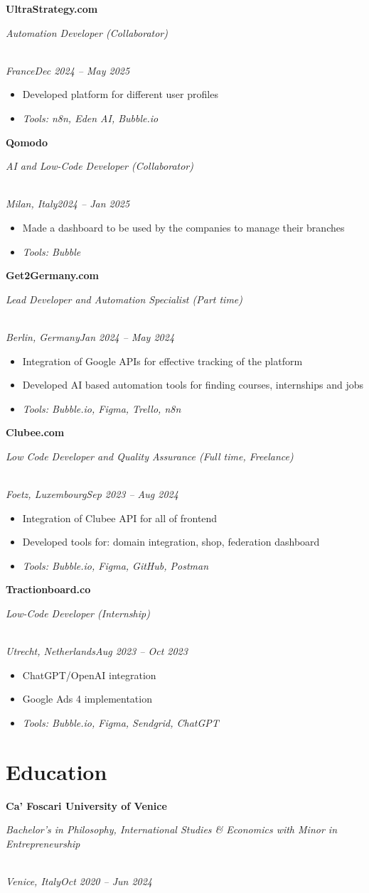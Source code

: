 \documentclass[a4paper,10pt]{article}
\newcommand{\role}[4]{\vspace{3pt}\noindent\hspace{0.6em}\parbox[t]{0.38\textwidth}{\raggedright\textbf{#1}}\hfill\parbox[t]{0.58\textwidth}{\raggedleft\textit{#2}}\\{\textit{#3}\hfill\textit{#4}}\vspace{1pt}}
\begin{document}
\role{UltraStrategy.com}{Automation Developer (Collaborator)}{France}{Dec 2024 -- May 2025}
\begin{itemize}
\item Developed platform for different user profiles
\item \textit{Tools: n8n, Eden AI, Bubble.io}
\end{itemize}

\role{Qomodo}{AI and Low-Code Developer (Collaborator)}{Milan, Italy}{2024 -- Jan 2025}
\begin{itemize}
\item Made a dashboard to be used by the companies to manage their branches
\item \textit{Tools: Bubble}
\end{itemize}

\role{Get2Germany.com}{Lead Developer and Automation Specialist (Part time)}{Berlin, Germany}{Jan 2024 -- May 2024}
\begin{itemize}
\item Integration of Google APIs for effective tracking of the platform
\item Developed AI based automation tools for finding courses, internships and jobs
\item \textit{Tools: Bubble.io, Figma, Trello, n8n}
\end{itemize}

\role{Clubee.com}{Low Code Developer and Quality Assurance (Full time, Freelance)}{Foetz, Luxembourg}{Sep 2023 -- Aug 2024}
\begin{itemize}
\item Integration of Clubee API for all of frontend
\item Developed tools for: domain integration, shop, federation dashboard
\item \textit{Tools: Bubble.io, Figma, GitHub, Postman}
\end{itemize}

\role{Tractionboard.co}{Low-Code Developer (Internship)}{Utrecht, Netherlands}{Aug 2023 -- Oct 2023}
\begin{itemize}
\item ChatGPT/OpenAI integration
\item Google Ads 4 implementation
\item \textit{Tools: Bubble.io, Figma, Sendgrid, ChatGPT}
\end{itemize}

\section{Education}
\role{Ca' Foscari University of Venice}{Bachelor's in Philosophy, International Studies \& Economics with Minor in Entrepreneurship}{Venice, Italy}{Oct 2020 -- Jun 2024}
\end{document}
